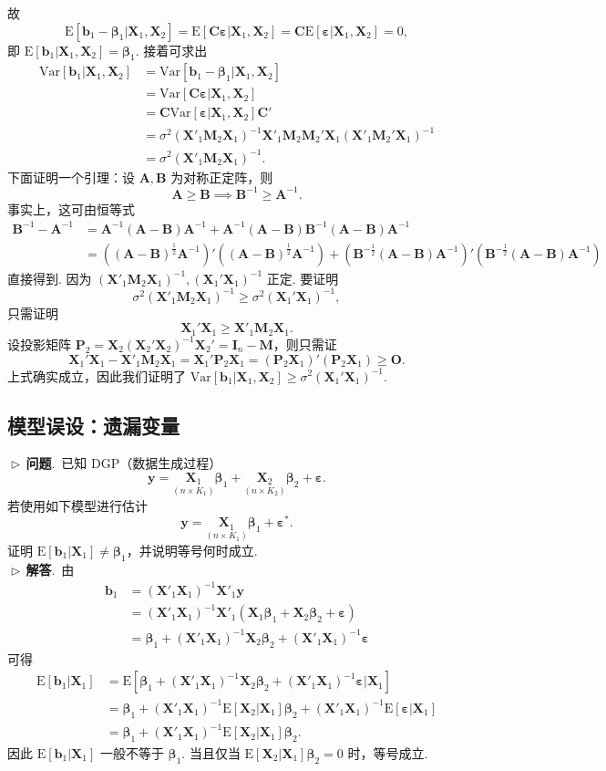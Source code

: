 \documentclass{article}
\newcommand{\E}{\mathrm{E}}
\newcommand{\Var}{\mathrm{Var}}
\newcommand{\y}{\mathbf{y}}
\newcommand{\X}{\mathbf{X}}
\newcommand{\M}{\mathbf{M}}
\newcommand{\0}{\mathbf{0}}
\newcommand{\vbe}{\bm{\beta}}
\newcommand{\vep}{\bm{\varepsilon}}
\newcommand{\vb}{\mathbf{b}}
\newcommand{\pro}{\noindent$\vartriangleright\,$\textbf{问题}.\ }
\newcommand{\sol}{\noindent$\vartriangleright\,$\textbf{解答}.\ }
\begin{document}
故
\[
\E[\vb_1-\vbe_1|\X_1,\X_2]=\E[\mathbf{C}\vep|\X_1,\X_2]=\mathbf{C}\E[\vep|\X_1,\X_2]=0,
\]
即 $\E[\vb_1|\X_1,\X_2]=\vbe_1$. 接着可求出
\begin{align*}
\Var[\vb_1|\X_1,\X_2]&=\Var[\vb_1-\vbe_1|\X_1,\X_2]\\
&=\Var[\mathbf{C}\vep|\X_1,\X_2]\\
&=\mathbf{C}\Var[\vep|\X_1,\X_2]\mathbf{C}'\\
&=\sigma^2(\X'_1\M_2\X_1)^{-1}\X'_1\M_2\M_2'\X_1(\X'_1\M_2'\X_1)^{-1}\\
&=\sigma^2(\X'_1\M_2\X_1)^{-1}.
\end{align*}
下面证明一个引理：设 $\mathbf{A},\mathbf{B}$ 为对称正定阵，则
\[
\mathbf{A}\ge\mathbf{B}\implies\mathbf{B}^{-1}\ge\mathbf{A}^{-1}.
\]
事实上，这可由恒等式
\[
\begin{aligned}
\mathbf{B}^{-1}-\mathbf{A}^{-1} 
&=\mathbf{A}^{-1}(\mathbf{A}-\mathbf{B})\mathbf{A}^{-1} + \mathbf{A}^{-1}(\mathbf{A}-\mathbf{B})\mathbf{B}^{-1}(\mathbf{A}-\mathbf{B})\mathbf{A}^{-1}\\
&=((\mathbf{A}-\mathbf{B})^{\frac{1}{2}}\mathbf{A}^{-1})'((\mathbf{A}-\mathbf{B})^{\frac{1}{2}}\mathbf{A}^{-1}) + (\mathbf{B}^{-\frac{1}{2}}(\mathbf{A}-\mathbf{B})\mathbf{A}^{-1})'(\mathbf{B}^{-\frac{1}{2}}(\mathbf{A}-\mathbf{B})\mathbf{A}^{-1})
\end{aligned}
\]
直接得到. 因为 $(\X'_1\M_2\X_1)^{-1}, (\X_1'\X_1)^{-1}$ 正定. 要证明
\[
\sigma^2(\X'_1\M_2\X_1)^{-1}\ge\sigma^2(\X_1'\X_1)^{-1},
\]
只需证明
\[
\X_1'\X_1\ge\X'_1\M_2\X_1.
\]
设投影矩阵 $\mathbf{P}_2=\X_2(\X_2'\X_2)^{-1}\X_2'=\mathbf{I}_n-\M$，则只需证
\[
\X_1'\X_1-\X'_1\M_2\X_1=\X_1'\mathbf{P}_2\X_1=(\mathbf{P}_2\X_1)'(\mathbf{P}_2\X_1)\ge\mathbf{O}.
\]
上式确实成立，因此我们证明了 $\Var[\vb_1|\X_1,\X_2]\ge\sigma^2(\X_1'\X_1)^{-1}$.

\subsection{模型误设：遗漏变量}
\pro 已知 DGP（数据生成过程）
\[
\y = \underset{(n\times K_1)}{\X_1} \vbe_1 +\underset{(n\times K_2)}{\X_2} \vbe_2+\vep.
\]
若使用如下模型进行估计
\[
\y = \underset{(n\times K_1)}{\X_1}\vbe_1 +\vep^*.
\]
证明 $\E[\vb_1|\X_1]\neq\vbe_1$，并说明等号何时成立.\\

\sol 由
\begin{align*}
\vb_1&=(\X'_1\X_1)^{-1}\X'_1\y\\
&=(\X'_1\X_1)^{-1}\X'_1(\X_1\vbe_1+\X_2\vbe_2+\vep)\\
&=\vbe_1+(\X'_1\X_1)^{-1}\X_2\vbe_2+(\X'_1\X_1)^{-1}\vep
\end{align*}
可得
\begin{align*}
\E[\vb_1|\X_1]&=\E[\vbe_1+(\X'_1\X_1)^{-1}\X_2\vbe_2+(\X'_1\X_1)^{-1}\vep|\X_1]\\
&=\vbe_1+(\X'_1\X_1)^{-1}\E[\X_2|\X_1]\vbe_2+(\X'_1\X_1)^{-1}\E[\vep|\X_1]\\
&=\vbe_1+(\X'_1\X_1)^{-1}\E[\X_2|\X_1]\vbe_2.
\end{align*}
因此 $\E[\vb_1|\X_1]$ 一般不等于 $\vbe_1$. 当且仅当 $\E[\X_2|\X_1]\vbe_2=0$ 时，等号成立.
\end{document}
